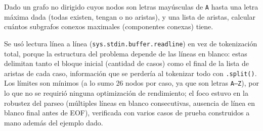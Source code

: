 
Dado un grafo no dirigido cuyos nodos son letras mayúsculas de \texttt{A} hasta una letra máxima dada (todas existen, tengan o no aristas), y una lista de aristas, calcular cuántos subgrafos conexos maximales (componentes conexas) tiene.

 Se usó lectura línea a línea (\texttt{sys.stdin.buffer.readline}) en vez de tokenización total, porque la estructura del problema depende de las líneas en blanco: estas delimitan tanto el bloque inicial (cantidad de casos) como el final de la lista de aristas de cada caso, información que se perdería al tokenizar todo con \texttt{.split()}. Los límites son mínimos (a lo sumo 26 nodos por caso, ya que son letras \texttt{A--Z}), por lo que no se requirió ninguna optimización de rendimiento; el foco estuvo en la robustez del parseo (múltiples líneas en blanco consecutivas, ausencia de línea en blanco final antes de EOF), verificada con varios casos de prueba construidos a mano además del ejemplo dado.


